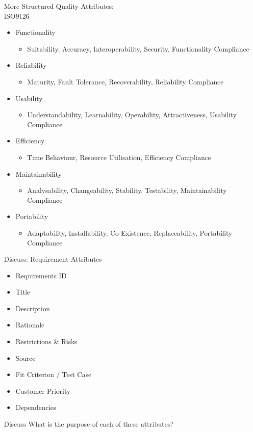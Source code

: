 \documentclass[10pt,t,a4paper]{beamer}
\begin{document}
\begin{frame}[label=sec-1-9]{More Structured Quality Attributes: \\ ISO9126}
\begin{itemize}
\item Functionality
\begin{itemize}
\item Suitability, Accuracy, Interoperability, Security, Functionality Compliance
\end{itemize}
\item Reliability
\begin{itemize}
\item Maturity, Fault Tolerance, Recoverability, Reliability Compliance
\end{itemize}
\item Usability
\begin{itemize}
\item Understandability, Learnability, Operability, Attractiveness, Usability Compliance
\end{itemize}
\item Efficiency
\begin{itemize}
\item Time Behaviour, Resource Utilisation, Efficiency Compliance
\end{itemize}
\item Maintainability
\begin{itemize}
\item Analysability, Changeability, Stability, Testability, Maintainability Compliance
\end{itemize}
\item Portability
\begin{itemize}
\item Adaptability, Installability, Co-Existence, Replaceability, Portability Compliance
\end{itemize}
\end{itemize}
\end{frame}
\begin{frame}[label=sec-1-10]{Discuss: Requirement Attributes}
\begin{itemize}
\item Requirements ID
\item Title
\item Description
\item Rationale
\item Restrictions \& Risks
\item Source
\item Fit Criterion / Test Case
\item Customer Priority
\item Dependencies
\end{itemize}
\begin{block}{Discuss}
What is the purpose of each of these attributes?
\end{block}
\end{frame}
\end{document}
